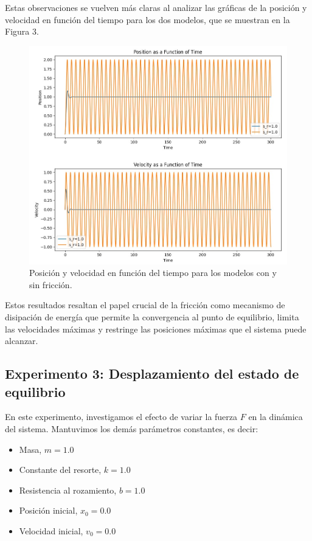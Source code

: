 \documentclass[]{article}
\begin{document}
Estas observaciones se vuelven más claras al analizar las gráficas de la posición y velocidad en función del tiempo para los dos modelos, que se muestran en la Figura 3. 


\begin{figure}[H]
\centering
\includegraphics[width=\textwidth]{../assets/figure_2_friction.jpeg}
\caption{Posición y velocidad en función del tiempo para los modelos con y sin fricción.}
\end{figure}

Estos resultados resaltan el papel crucial de la fricción como mecanismo de disipación de energía que permite la convergencia al punto de equilibrio, limita las velocidades máximas y restringe las posiciones máximas que el sistema puede alcanzar.

\subsection{Experimento 3: Desplazamiento del estado de equilibrio}

En este experimento, investigamos el efecto de variar la fuerza $F$ en la dinámica del sistema. Mantuvimos los demás parámetros constantes, es decir:

\begin{itemize}
\item Masa, $m = 1.0$
\item Constante del resorte, $k = 1.0$
\item Resistencia al rozamiento, $b = 1.0$
\item Posición inicial, $x_0 = 0.0$
\item Velocidad inicial, $v_0 = 0.0$
\end{itemize}
\end{document}
